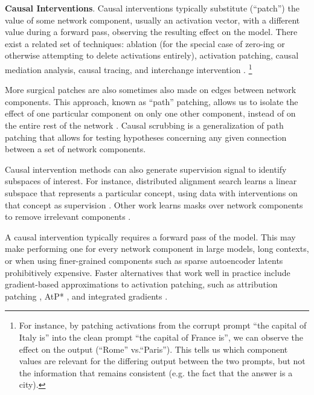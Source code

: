 \textbf{Causal Interventions}. Causal interventions typically substitute (“patch”) the value of some network component, usually an activation vector, with a different value during a forward pass, observing the resulting effect on the model. There exist a related set of techniques: ablation (for the special case of zero-ing or otherwise attempting to delete activations entirely), activation patching, causal mediation analysis, causal tracing, and interchange intervention \citep{vig2020causalmediationanalysisinterpreting, geiger2020neuralnaturallanguageinference, meng2023locatingeditingfactualassociations, Chan_Garriga-alonso_Goldowsky-Dill_2022, NeelNanda_2023a}. \footnote{For instance, by patching activations from the corrupt prompt “the capital of Italy is” into the clean prompt “the capital of France is”, we can observe the effect on the output (“Rome” vs.“Paris”). This tells us which component values are relevant for the differing output between the two prompts, but not the information that remains consistent (e.g. the fact that the answer is a city).}

More surgical patches are also sometimes also made on edges between network components. This approach, known as “path” patching, allows us to isolate the effect of one particular component on only one other component, instead of on the entire rest of the network \citep{goldowskydill2023localizingmodelbehaviorpath}. Causal scrubbing \citep{Chan_Garriga-alonso_Goldowsky-Dill_2022} is a generalization of path patching that allows for testing hypotheses concerning any given connection between a set of network components.

Causal intervention methods can also generate supervision signal to identify subspaces of interest. For instance, distributed alignment search \citep{geiger2024findingalignmentsinterpretablecausal} learns a linear subspace that represents a particular concept, using data with interventions on that concept as supervision \citep{geiger2024findingalignmentsinterpretablecausal, guerner2024geometricnotioncausalprobing, wu2024interpretabilityscaleidentifyingcausal}. Other work learns masks over network components to remove irrelevant components \citep{de-cao-etal-2020-decisions, csordás2021neuralnetsmodularinspecting, davies2023discoveringvariablebindingcircuitry}.

A causal intervention typically requires a forward pass of the model. This may make performing one for every network component in large models, long contexts, or when using finer-grained components such as sparse autoencoder latents prohibitively expensive. Faster alternatives that work well in practice \citep{marks2024sparsefeaturecircuitsdiscovering,templeton2024scaling} include gradient-based approximations to activation patching, such as attribution patching \citep{NeelNanda_2023a, syed2023attributionpatchingoutperformsautomated}, AtP* \citep{kramár2024atpefficientscalablemethod}, and integrated gradients \citep{Sundarajan_2017_IntegratedGradients}.

